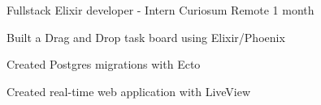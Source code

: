 

\begin{cventries}

  \cventry
    {Fullstack Elixir developer - Intern} %
    {Curiosum} %
    {Remote} %
    {1 month} %
    {
      \begin{cvitems} %
        \item {Built a Drag and Drop task board using Elixir/Phoenix}
        \item {Created Postgres migrations with Ecto}
        \item {Created real-time web application with LiveView}
      \end{cvitems}
    }

\end{cventries}
